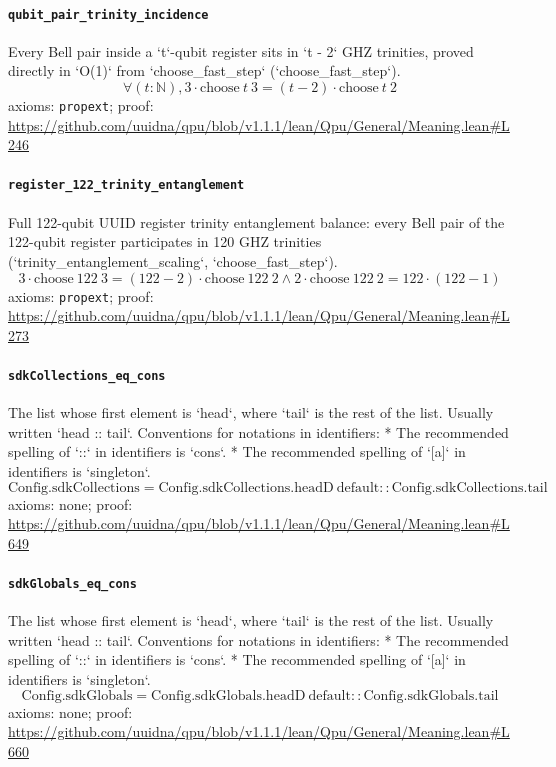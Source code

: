 \documentclass[11pt]{article}
\begin{document}
\paragraph{\texttt{qubit\_pair\_trinity\_incidence}}
Every Bell pair inside a `t`-qubit register sits in `t - 2` GHZ trinities, proved directly in `O(1)` from `choose\_fast\_step` (`choose\_fast\_step`).
\[ \forall (t : \mathbb{N}), 3 \cdot \mathrm{choose}\ t\ 3 = (t - 2) \cdot \mathrm{choose}\ t\ 2 \]
\noindent axioms: \texttt{propext}; proof: \url{https://github.com/uuidna/qpu/blob/v1.1.1/lean/Qpu/General/Meaning.lean\#L246}

\paragraph{\texttt{register\_122\_trinity\_entanglement}}
Full 122-qubit UUID register trinity entanglement balance: every Bell pair of the 122-qubit register participates in 120 GHZ trinities (`trinity\_entanglement\_scaling`, `choose\_fast\_step`).
\[ 3 \cdot \mathrm{choose}\ 122\ 3 = (122 - 2) \cdot \mathrm{choose}\ 122\ 2 \land 2 \cdot \mathrm{choose}\ 122\ 2 = 122 \cdot (122 - 1) \]
\noindent axioms: \texttt{propext}; proof: \url{https://github.com/uuidna/qpu/blob/v1.1.1/lean/Qpu/General/Meaning.lean\#L273}

\paragraph{\texttt{sdkCollections\_eq\_cons}}
The list whose first element is `head`, where `tail` is the rest of the list. Usually written `head :: tail`.   Conventions for notations in identifiers:   * The recommended spelling of `::` in identifiers is `cons`.   * The recommended spelling of `[a]` in identifiers is `singleton`.
\[ \mathrm{Config.sdkCollections} = \mathrm{Config.sdkCollections.headD}\ \mathrm{default} :: \mathrm{Config.sdkCollections.tail} \]
\noindent axioms: none; proof: \url{https://github.com/uuidna/qpu/blob/v1.1.1/lean/Qpu/General/Meaning.lean\#L649}

\paragraph{\texttt{sdkGlobals\_eq\_cons}}
The list whose first element is `head`, where `tail` is the rest of the list. Usually written `head :: tail`.   Conventions for notations in identifiers:   * The recommended spelling of `::` in identifiers is `cons`.   * The recommended spelling of `[a]` in identifiers is `singleton`.
\[ \mathrm{Config.sdkGlobals} = \mathrm{Config.sdkGlobals.headD}\ \mathrm{default} :: \mathrm{Config.sdkGlobals.tail} \]
\noindent axioms: none; proof: \url{https://github.com/uuidna/qpu/blob/v1.1.1/lean/Qpu/General/Meaning.lean\#L660}
\end{document}
